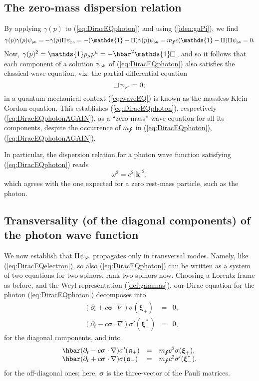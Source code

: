 \documentclass[11pt]{article}
\theoremstyle{definition}
\newcommand{\refeq}[1]{(\ref{#1})}
\newcommand{\vect}[1] {\boldsymbol{{ #1}} }
\newcommand{\kV}{{\vect{k}}}		%
\numberwithin{equation}{section}
\newcommand{\fa}{\mathfrak{a}}
\newcommand{\bfa}{\boldsymbol{\fa}}
\newcommand{\beq}{\begin{equation}}
\newcommand{\eeq}{\end{equation}}
\newcommand{\Id}{\mathds{1}}
\newcommand{\p}{\partial}
\newcommand{\siV}{\boldsymbol{\sigma}}
\newcommand{\xiV}{{\boldsymbol{\xi}}}
\newcommand{\psiPH}{{\psi_{\mbox{\rm\tiny ph}}}}
\newcommand{\mPH}{{m_{\mbox{\Lightning}}}}
\newcommand{\ga}{\gamma}
\newcommand{\si}{\sigma}
\newcommand{\nab}{\nabla}
\newcommand{\dal}{\raisebox{3pt}{\fbox{}}\,}
\begin{document}
\subsection{The zero-mass dispersion relation}
%
By applying $\ga(p)$ to  \refeq{eq:DiracEQphoton} and using \refeq{iden:gaPi}, we find
\beq 
\ga(p)\ga(p)\psiPH = - \ga(p)\Pi \psiPH = - (\Id - \Pi) \ga(p) \psiPH = \mPH c (\Id - \Pi)\Pi \psiPH = 0.
\eeq
 Now, $\ga(p)^2 = \Id p_\mu p^\mu  = - \hbar^2 \Id \dal$, and so it follows that each component of a solution $\psiPH$ of \refeq{eq:DiracEQphoton} 
also satisfies the classical wave equation, viz. the partial differential equation
\beq \label{eq:waveEQ}
\dal\psiPH=0;
\eeq
in a quantum-mechanical context \refeq{eq:waveEQ} is known as the massless Klein--Gordon equation.
 This establishes (\ref{eq:DiracEQphoton}), respectively (\ref{eq:DiracEQphotonAGAIN}),
 as a ``zero-mass'' wave equation for all its components, 
despite the occurrence of $\mPH$ in (\ref{eq:DiracEQphoton}), (\ref{eq:DiracEQphotonAGAIN}).
 
 In particular, the dispersion relation for a photon wave function satisfying (\ref{eq:DiracEQphoton}) reads
\beq \label{dispREL}
\omega^2 = c^2|\kV|^2,
\eeq
which agrees with the one expected for a zero rest-mass particle, such as the photon. 
%
\subsection{Transversality (of the diagonal components) of the photon wave function} 
%
We now establish that $\Pi\psiPH$ propagates only in transversal modes.
 Namely, like (\ref{eq:DiracEQelectron}), so also (\ref{eq:DiracEQphoton}) can be written 
as a system of two equations for two spinors, rank-two spinors now.
  Choosing a Lorentz frame as before, and  the Weyl representation \refeq{def:gammas}, 
our Dirac equation for the photon (\ref{eq:DiracEQphoton}) decomposes into
\beq 
\begin{array}{lcl}\label{DIRACeqSPLITdiag}
\phantom{\hbar} (\p_t + c\siV\cdot\nab)\si(\xiV_+) \!\!&=&\!\! 0, \\
\phantom{\hbar} (\p_t - c\siV\cdot\nab)\si'(\xiV_-^*) \!\!&=&\!\! 0,
\end{array}
\eeq
for the diagonal components, and into
\beq 
\begin{array}{lcl}\label{DIRACeqSPLIToffDIAG}
\hbar (\p_t - c\siV\cdot\nab) \si'(\bfa_+) & = & \mPH c^2\si (\xiV_+),\\
\hbar (\p_t + c\siV\cdot\nab) \si (\bfa_-) & = & \mPH c^2\si'(\xiV_-^*),
\end{array}
\eeq
for the off-diagonal ones; here, $\siV$ is the three-vector of the Pauli matrices.
\end{document}
